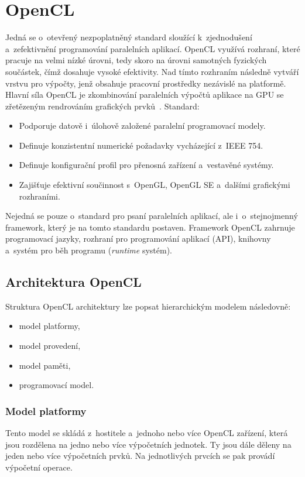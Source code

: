 \section{OpenCL}
Jedná se o~otevřený nezpoplatněný standard sloužící k~zjednodušení a~zefektivnění programování
paralelních aplikací. OpenCL využívá rozhraní, které pracuje na velmi nízké úrovni, tedy skoro na
úrovni samotných fyzických součástek, čímž dosahuje vysoké efektivity. Nad tímto rozhraním následně
vytváří vrstvu pro výpočty, jenž obsahuje pracovní prostředky nezávislé na platformě. Hlavní síla
OpenCL je zkombinování paralelních výpočtů aplikace na GPU se zřetězeným rendrováním grafických
prvků~\cite{Khronos:2015}.
Standard:
\begin{itemize}
    \item Podporuje datově i~úlohově založené paralelní programovací modely.
    \item Definuje konzistentní numerické požadavky vycházející z~IEEE 754.
    \item Definuje konfigurační profil pro přenosná zařízení a~vestavěné systémy.
    \item Zajišťuje efektivní součinnost s~OpenGL, OpenGL SE a~dalšími grafickými
        rozhraními.
\end{itemize}
Nejedná se pouze o~standard pro psaní paralelních aplikací, ale i~o~stejnojmenný framework, který
je na tomto standardu postaven. Framework OpenCL zahrnuje programovací jazyky, rozhraní pro
programování aplikací (API), knihovny a~systém pro běh programu ({\it runtime} systém).
\subsection{Architektura OpenCL}
Struktura OpenCL architektury lze popsat hierarchickým modelem následovně:
\begin{itemize}
    \item model platformy,
    \item model provedení,
    \item model paměti,
    \item programovací model.
\end{itemize}

\subsubsection{Model platformy}
Tento model se skládá z~hostitele a~jednoho nebo více OpenCL zařízení, která jsou rozdělena na
jedno nebo více výpočetních jednotek. Ty jsou dále děleny na jeden nebo více výpočetních prvků.
Na jednotlivých prvcích se pak provádí výpočetní operace.

